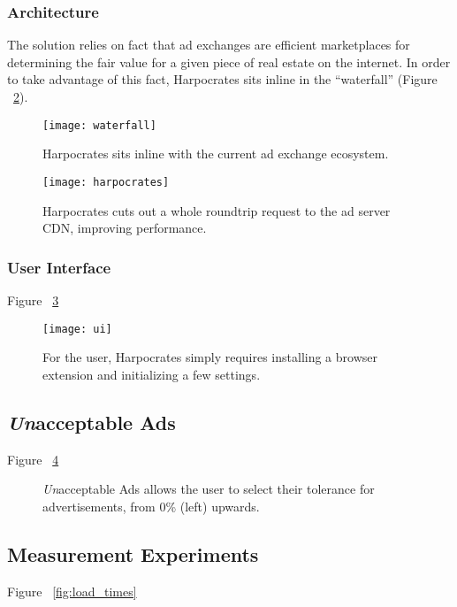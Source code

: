 \subsubsection{Architecture}
The solution relies on fact that ad exchanges are efficient marketplaces for determining the fair value for a given piece of real estate on the internet.
In order to take advantage of this fact, Harpocrates sits inline in the ``waterfall'' (Figure ~\ref{fig:waterfall}).

\begin{figure}[h]
\centering
\texttt{[image: waterfall]}
\caption{Harpocrates sits inline with the current ad exchange ecosystem.}
\label{fig:waterfall}
\end{figure}

\begin{figure}[h]
\centering
\texttt{[image: harpocrates]}
\caption{Harpocrates cuts out a whole roundtrip request to the ad server CDN, improving performance.}
\label{fig:waterfall}
\end{figure}

\subsubsection{User Interface}
Figure ~\ref{fig:ui}

\begin{figure}[h]
\centering
\texttt{[image: ui]}
\caption{For the user, Harpocrates simply requires installing a browser extension and initializing a few settings.}
\label{fig:ui}
\end{figure}

\subsection{\textit{Un}acceptable Ads}
Figure ~\ref{fig:unacceptable}

\begin{figure}[h]
\hfill
{}
\hfill
{}
\caption{\textit{Un}acceptable Ads allows the user to select their tolerance for advertisements, from 0\% (left) upwards.}
\label{fig:unacceptable}
\end{figure}

\subsection{Measurement Experiments}
Figure ~\ref{fig:load_times}

